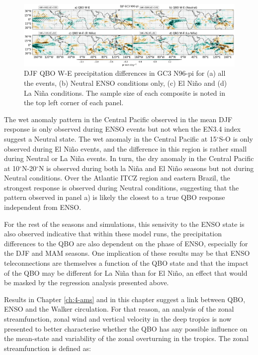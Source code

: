 \begin{figure}[t!]
\centering
 \includegraphics[width=\linewidth]{figures/ensoqboprdjf.png}
\caption[Precipitation response to QBO W-E for GC3 N96-pi under different QBO phases.]{ DJF QBO W-E precipitation differences in GC3 N96-pi for (a) all the events, (b) Neutral ENSO conditions only, (c) El Niño and (d) La Niña conditions. The sample size of each composite is noted in the top left corner of each panel. }
\label{fig:qboenso}
\end{figure}

The wet anomaly pattern in the Central Pacific observed in the mean DJF response is only observed during ENSO events but not when the EN3.4 index suggest a Neutral state. The wet anomaly in the Central Pacific at 15$^\circ$S-O is only observed during El Niño events, and the difference in this region is rather small during Neutral or La Niña events. In turn, the dry anomaly in the Central Pacific at 10$^\circ$N-20$^\circ$N is observed during both la Niña and El Niño seasons but not during Neutral conditions.
 Over the Atlantic ITCZ region and eastern Brazil, the strongest response is observed during Neutral conditions, suggesting that the pattern observed in panel a) is likely the closest to a true QBO response independent from ENSO. 

For the rest of the seasons and simulations, this sensivity to the ENSO state is also observed indicative that within these model runs, the precipitation differences to the QBO are also dependent on the phase of ENSO, especially for the DJF and MAM seasons.
One implication of these results may be that ENSO teleconnections are themselves a function of the QBO state and that the impact of the QBO may be different for La Niña than for El Niño, an effect that would be masked by the regression analysis presented above. 

Results in Chapter \ref{ch:4-ams} and in this chapter suggest a link between QBO, ENSO and the Walker circulation. For that reason, an analysis of the zonal streamfunction, zonal wind and vertical velocity in the deep tropics is now presented to better characterise whether the QBO has any possible influence on the mean-state and variability of the zonal overturning in the tropics. 
The zonal streamfunction \citep{yu2010,bayr2014} is defined as:

